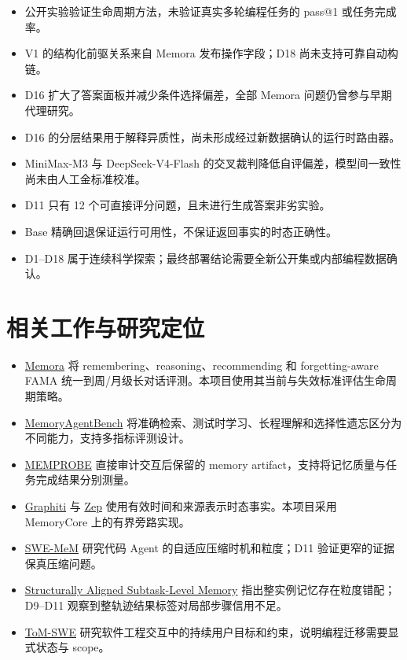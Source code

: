 \begin{itemize}
\item 公开实验验证生命周期方法，未验证真实多轮编程任务的 pass@1 或任务完成率。
\item V1 的结构化前驱关系来自 Memora 发布操作字段；D18 尚未支持可靠自动构链。
\item D16 扩大了答案面板并减少条件选择偏差，全部 Memora 问题仍曾参与早期代理研究。
\item D16 的分层结果用于解释异质性，尚未形成经过新数据确认的运行时路由器。
\item MiniMax-M3 与 DeepSeek-V4-Flash 的交叉裁判降低自评偏差，模型间一致性尚未由人工金标准校准。
\item D11 只有 12 个可直接评分问题，且未进行生成答案非劣实验。
\item Base 精确回退保证运行可用性，不保证返回事实的时态正确性。
\item D1--D18 属于连续科学探索；最终部署结论需要全新公开集或内部编程数据确认。
\end{itemize}

\section{相关工作与研究定位}

\begin{itemize}
\item \href{https://arxiv.org/abs/2604.20006}{Memora} 将 remembering、reasoning、recommending 和 forgetting-aware FAMA 统一到周/月级长对话评测。本项目使用其当前与失效标准评估生命周期策略。
\item \href{https://arxiv.org/abs/2507.05257}{MemoryAgentBench} 将准确检索、测试时学习、长程理解和选择性遗忘区分为不同能力，支持多指标评测设计。
\item \href{https://arxiv.org/abs/2606.24595}{MEMPROBE} 直接审计交互后保留的 memory artifact，支持将记忆质量与任务完成结果分别测量。
\item \href{https://github.com/getzep/graphiti}{Graphiti} 与 \href{https://arxiv.org/abs/2501.13956}{Zep} 使用有效时间和来源表示时态事实。本项目采用 MemoryCore 上的有界旁路实现。
\item \href{https://arxiv.org/abs/2606.28434}{SWE-MeM} 研究代码 Agent 的自适应压缩时机和粒度；D11 验证更窄的证据保真压缩问题。
\item \href{https://arxiv.org/abs/2602.21611}{Structurally Aligned Subtask-Level Memory} 指出整实例记忆存在粒度错配；D9--D11 观察到整轨迹结果标签对局部步骤信用不足。
\item \href{https://arxiv.org/abs/2510.21903}{ToM-SWE} 研究软件工程交互中的持续用户目标和约束，说明编程迁移需要显式状态与 scope。
\end{itemize}

